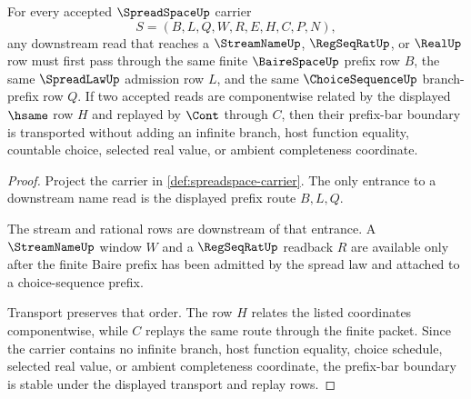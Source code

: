 \begin{theorem}
\label{thm:spreadspace-prefix-bar-stability}
For every accepted $\SpreadSpaceUp$ carrier
$$
S=(B,L,Q,W,R,E,H,C,P,N),
$$
any downstream read that reaches a $\StreamNameUp$, $\RegSeqRatUp$, or $\RealUp$ row must first pass through the same finite $\BaireSpaceUp$ prefix row $B$, the same $\SpreadLawUp$ admission row $L$, and the same $\ChoiceSequenceUp$ branch-prefix row $Q$. If two accepted reads are componentwise related by the displayed $\hsame$ row $H$ and replayed by $\Cont$ through $C$, then their prefix-bar boundary is transported without adding an infinite branch, host function equality, countable choice, selected real value, or ambient completeness coordinate.
\end{theorem}
\begin{proof}
Project the carrier in \autoref{def:spreadspace-carrier}. The only entrance to a downstream name read is the displayed prefix route $B,L,Q$.

The stream and rational rows are downstream of that entrance. A $\StreamNameUp$ window $W$ and a $\RegSeqRatUp$ readback $R$ are available only after the finite Baire prefix has been admitted by the spread law and attached to a choice-sequence prefix.

Transport preserves that order. The row $H$ relates the listed coordinates componentwise, while $C$ replays the same route through the finite packet. Since the carrier contains no infinite branch, host function equality, choice schedule, selected real value, or ambient completeness coordinate, the prefix-bar boundary is stable under the displayed transport and replay rows.
\end{proof}

